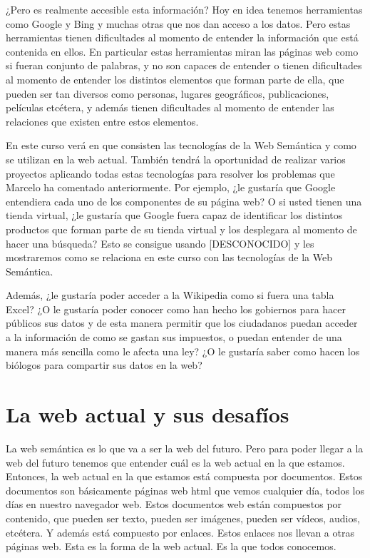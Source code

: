  ¿Pero es realmente accesible esta información? Hoy en idea tenemos herramientas como Google y Bing y muchas otras que nos dan acceso a los datos. Pero estas herramientas tienen dificultades al momento de entender la información que está contenida en ellos. En particular estas herramientas miran las páginas web como si fueran conjunto de palabras, y no son capaces de entender o tienen dificultades al momento de entender los distintos elementos que forman parte de ella, que pueden ser tan diversos como personas, lugares geográficos, publicaciones, películas etcétera, y además tienen dificultades al momento de entender las relaciones que existen entre estos elementos.
 
 En este curso verá en que consisten las tecnologías de la Web Semántica y como se utilizan en la web actual. También tendrá la oportunidad de realizar varios proyectos aplicando todas estas tecnologías para resolver los problemas que Marcelo ha comentado anteriormente. Por ejemplo, ¿le gustaría que Google entendiera cada uno de los componentes de su página web? O si usted tienen una tienda virtual, ¿le gustaría que Google fuera capaz de identificar los distintos productos que forman parte de su tienda virtual y los desplegara al momento de hacer una búsqueda? Esto se consigue usando [DESCONOCIDO] y les mostraremos como se relaciona en este curso con las tecnologías de la Web Semántica.
 
 Además, ¿le gustaría poder acceder a la Wikipedia como si fuera una tabla Excel? ¿O le gustaría poder conocer como han hecho los gobiernos para hacer públicos sus datos y de esta manera permitir que los ciudadanos puedan acceder a la información de como se gastan sus impuestos, o puedan entender de una manera más sencilla como le afecta una ley? ¿O le gustaría saber como hacen los biólogos para compartir sus datos en la web?
 
 \section{La web actual y sus desafíos}
 
 La web semántica es lo que va a ser la web del futuro. Pero para poder llegar a la web del futuro tenemos que entender cuál es la web actual en la que estamos. Entonces, la web actual en la que estamos está compuesta por documentos. Estos documentos son básicamente páginas web html que vemos cualquier día, todos los días en nuestro navegador web. Estos documentos web están compuestos por contenido, que pueden ser texto, pueden ser imágenes, pueden ser vídeos, audios, etcétera. Y además está compuesto por enlaces. Estos enlaces nos llevan a otras páginas web. Esta es la forma de la web actual. Es la que todos conocemos.
 
